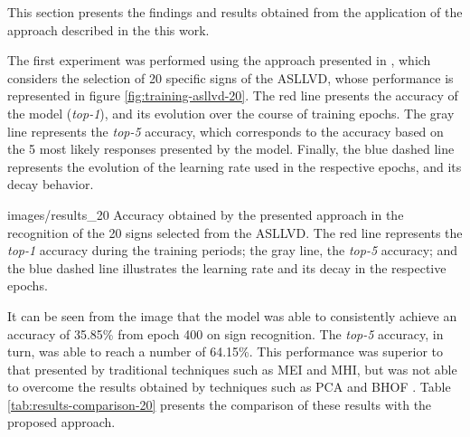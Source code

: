 This section presents the findings and results obtained from the application of the approach described in the this work.


The first experiment was performed using the approach presented in \cite{lim-2016}, which considers the selection of 20 specific signs of the ASLLVD, whose performance is represented in figure \ref{fig:training-asllvd-20}. The red line presents the accuracy of the model (\textit{top-1}), and its evolution over the course of training epochs. The gray line represents the \textit{top-5} accuracy, which corresponds to the accuracy based on the 5 most likely responses presented by the model. Finally, the blue dashed line represents the evolution of the learning rate used in the respective epochs, and its decay behavior.


    {images/results_20}
    {Accuracy obtained by the presented approach in the recognition of the 20 signs selected from the ASLLVD. The red line represents the \textit{top-1} accuracy during the training periods; the gray line, the \textit{top-5} accuracy; and the blue dashed line illustrates the learning rate and its decay in the respective epochs.}

It can be seen from the image that the model was able to consistently achieve an accuracy of 35.85\% from epoch 400 on sign recognition. The \textit{top-5} accuracy, in turn, was able to reach a number of 64.15\%. This performance was superior to that presented by traditional techniques such as MEI and MHI, but was not able to overcome the results obtained by techniques such as PCA and BHOF \cite{lim-2016}. Table \ref{tab:results-comparison-20} presents the comparison of these results with the proposed approach.

